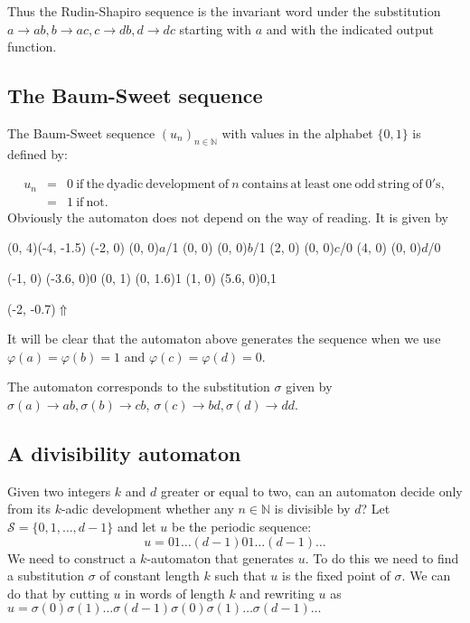 \documentclass{article}
\begin{document}
Thus the Rudin-Shapiro sequence is the invariant word under the substitution
$a \to ab, b \to ac, c \to db, d \to dc$
starting with $a$ and with the indicated output function.

\subsection{The Baum-Sweet sequence}
The Baum-Sweet sequence $(u_n)_{n \in \mathbb{N}}$ with values in the alphabet
$\{0, 1\}$ is defined by:

\vbox{\begin{eqnarray*}
u_n &=& 0 \mathrm{\ if\ the\ dyadic\ development\ of\ } n
          \mathrm{\ contains\ at\ least\ one\ odd\ string\ of\ 0's},\\
    &=& 1 \mathrm{\ if\ not.}
\end{eqnarray*}}
Obviously the automaton does not depend on the way of reading. It is given by

\begin{graph}(0, 4)(-4, -1.5)
  (-2, 0) (0, 0){$a$/1}
  (0, 0)  (0, 0){$b$/1}
  (2, 0)  (0, 0){$c$/0}
  (4, 0)  (0, 0){$d$/0}

  (-1, 0) \freetext(-3.6, 0){0}
   
   
  (0, 1) \freetext(0, 1.6){1}
   
   
  (1, 0) \freetext(5.6, 0){0,1}

  \freetext(-2, -0.7){$\Uparrow$}
\end{graph}

It will be clear that the automaton above generates the sequence when we use
$\varphi(a) = \varphi(b) = 1$ and $\varphi(c) = \varphi(d) = 0$.

The automaton corresponds to the substitution $\sigma$ given by
$\sigma(a) \to ab, \sigma(b) \to cb$,
$\sigma(c) \to bd, \sigma(d) \to dd$.

\subsection{A divisibility automaton}
Given two integers $k$ and $d$ greater or equal to two, can an automaton 
decide only from its $k$-adic development whether any $n \in \mathbb{N}$ is
divisible by $d$? Let $\mathcal{S} = \{0, 1, \ldots, d - 1\}$ and let $u$ be the
periodic sequence:
\begin{displaymath}
  u = 01\ldots(d - 1)01\ldots(d - 1)\ldots
\end{displaymath}
We need to construct a $k$-automaton that generates $u$. To do this we need to
find a substitution $\sigma$ of constant length $k$ such that $u$ is the fixed
point of $\sigma$. We can do that by cutting $u$ in words of length $k$ and
rewriting $u$ as
$u = \sigma(0)\sigma(1)\ldots\sigma(d - 1)\sigma(0)\sigma(1)\ldots\sigma(d - 1)\ldots$
\end{document}
